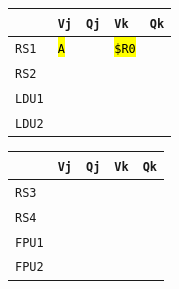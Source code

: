 \begin{enumerate}
    \begin{minipage}{0.45\textwidth}
        \centering
        \begin{tabular}{@{} l | l l l l @{}}
            \toprule
                & \texttt{Vj} & \texttt{Qj} & \texttt{Vk} & \texttt{Qk} \\
            \midrule
            \texttt{RS1} & \hl{\texttt{A}} & & \hl{\texttt{\$R0}} & \\ [.3em]
            \texttt{RS2} & & & & \\
            \cmidrule{1-5}
            \texttt{LDU1} & & & & \\ [.3em]
            \texttt{LDU2} & & & & \\
            \bottomrule
        \end{tabular}
    \end{minipage}
    \hfill
    \begin{minipage}{0.45\textwidth}
        \centering
        \begin{tabular}{@{} l | l l l l @{}}
            \toprule
            & \texttt{Vj} & \texttt{Qj} & \texttt{Vk} & \texttt{Qk} \\
            \midrule
            \texttt{RS3} & & & & \\ [.3em]
            \texttt{RS4} & & & & \\
            \cmidrule{1-5}
            \texttt{FPU1} & & & & \\ [.3em]
            \texttt{FPU2} & & & & \\
            \bottomrule
        \end{tabular}
    \end{minipage}


\end{enumerate}
